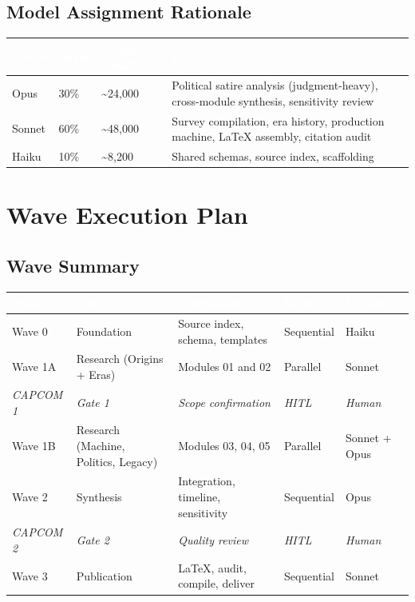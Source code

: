 \documentclass[11pt,letterpaper]{article}
\newcommand{\tableheader}[1]{\textbf{\sffamily\textcolor{white}{#1}}}
\begin{document}
\subsection{Model Assignment Rationale}

\begin{center}
\begin{tabularx}{\textwidth}{L{2cm}C{1.5cm}C{2cm}X}
\toprule
{}
\tableheader{Model} & \tableheader{Share} & \tableheader{Token Budget} & \tableheader{Rationale} \\
\midrule
Opus & 30\% & \textasciitilde{}24,000 & Political satire analysis (judgment-heavy), cross-module synthesis, sensitivity review \\
Sonnet & 60\% & \textasciitilde{}48,000 & Survey compilation, era history, production machine, LaTeX assembly, citation audit \\
Haiku & 10\% & \textasciitilde{}8,200 & Shared schemas, source index, scaffolding \\
\bottomrule
\end{tabularx}
\end{center}

\section{Wave Execution Plan}

\subsection{Wave Summary}

\begin{center}
\begin{tabularx}{\textwidth}{L{1.8cm}L{2.5cm}XC{1.5cm}C{2cm}}
\toprule
{}
\tableheader{Wave} & \tableheader{Name} & \tableheader{Components} & \tableheader{Mode} & \tableheader{Model(s)} \\
\midrule
Wave 0 & Foundation & Source index, schema, templates & Sequential & Haiku \\
Wave 1A & Research (Origins + Eras) & Modules 01 and 02 & Parallel & Sonnet \\
\textit{CAPCOM 1} & \textit{Gate 1} & \textit{Scope confirmation} & \textit{HITL} & \textit{Human} \\
Wave 1B & Research (Machine, Politics, Legacy) & Modules 03, 04, 05 & Parallel & Sonnet + Opus \\
Wave 2 & Synthesis & Integration, timeline, sensitivity & Sequential & Opus \\
\textit{CAPCOM 2} & \textit{Gate 2} & \textit{Quality review} & \textit{HITL} & \textit{Human} \\
Wave 3 & Publication & LaTeX, audit, compile, deliver & Sequential & Sonnet \\
\bottomrule
\end{tabularx}
\end{center}
\end{document}
